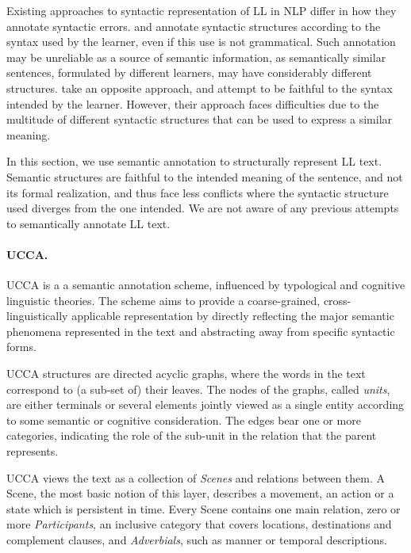 \documentclass[letter,11pt]{article}
\begin{document}
Existing approaches to syntactic representation of LL in NLP
differ in how they annotate syntactic errors.
 and 
annotate syntactic structures according to the syntax used
by the learner, even if this use is not grammatical.
Such annotation may be unreliable as a source of semantic information,
as semantically similar sentences, formulated by different learners,
may have considerably different structures.  take an opposite approach, and attempt
to be faithful to the syntax intended by the learner. However, their
approach faces difficulties due to the multitude of different syntactic
structures that can be used to express a similar meaning.


In this section, we use semantic annotation to structurally
represent LL text. Semantic structures are faithful to the intended
meaning of the sentence, and not its formal realization, and thus face
less conflicts where the syntactic structure used diverges from
the one intended. We are not aware of any previous attempts to semantically
annotate LL text.


\paragraph{UCCA.}\label{sec:ucca}
UCCA is a a semantic annotation scheme, influenced
by typological and cognitive linguistic theories.
The scheme aims to provide a coarse-grained, cross-linguistically
applicable representation by directly reflecting the major semantic
phenomena represented in the text and abstracting away from
specific syntactic forms.

UCCA structures are directed acyclic graphs, where the words in the text 
correspond to (a sub-set of) their leaves.
The nodes of the graphs, called {\it units}, are either terminals or several elements jointly
viewed as a single entity according to some semantic  or cognitive consideration.
The edges bear one or more categories, indicating the role of 
the sub-unit in the relation that the parent represents.%

UCCA views the text as a collection of {\it Scenes} and relations between them.
A Scene, the most basic notion of this layer, describes a movement, 
an action or a state which is persistent in time.
Every Scene contains one main relation, 
zero or more {\it Participants}, 
an inclusive category that covers locations, destinations and complement
clauses, and {\it Adverbials}, such as manner or temporal descriptions.
\end{document}
